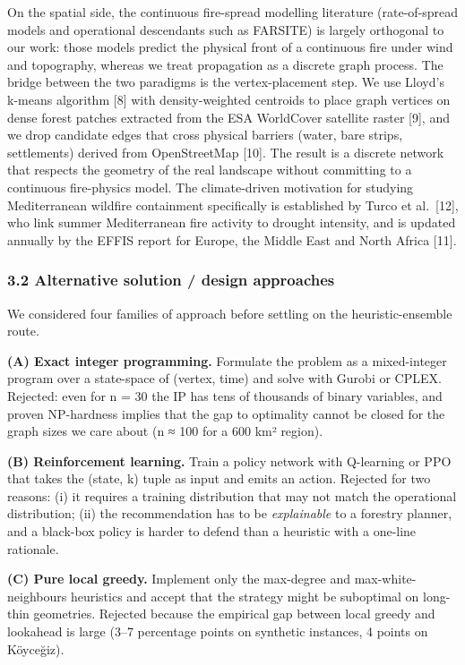 \documentclass[
  11pt,
]{article}
\begin{document}
On the spatial side, the continuous fire-spread modelling literature
(rate-of-spread models and operational descendants such as FARSITE) is
largely orthogonal to our work: those models predict the physical front
of a continuous fire under wind and topography, whereas we treat
propagation as a discrete graph process. The bridge between the two
paradigms is the vertex-placement step. We use Lloyd's k-means algorithm
{[}8{]} with density-weighted centroids to place graph vertices on dense
forest patches extracted from the ESA WorldCover satellite raster
{[}9{]}, and we drop candidate edges that cross physical barriers
(water, bare strips, settlements) derived from OpenStreetMap {[}10{]}.
The result is a discrete network that respects the geometry of the real
landscape without committing to a continuous fire-physics model. The
climate-driven motivation for studying Mediterranean wildfire
containment specifically is established by Turco et al.~{[}12{]}, who
link summer Mediterranean fire activity to drought intensity, and is
updated annually by the EFFIS report for Europe, the Middle East and
North Africa {[}11{]}.

\subsubsection{3.2 Alternative solution / design
approaches}\label{alternative-solution-design-approaches}

We considered four families of approach before settling on the
heuristic-ensemble route.

\textbf{(A) Exact integer programming.} Formulate the problem as a
mixed-integer program over a state-space of (vertex, time) and solve
with Gurobi or CPLEX. Rejected: even for n = 30 the IP has tens of
thousands of binary variables, and proven NP-hardness implies that the
gap to optimality cannot be closed for the graph sizes we care about (n
≈ 100 for a 600 km² region).

\textbf{(B) Reinforcement learning.} Train a policy network with
Q-learning or PPO that takes the (state, k) tuple as input and emits an
action. Rejected for two reasons: (i) it requires a training
distribution that may not match the operational distribution; (ii) the
recommendation has to be \emph{explainable} to a forestry planner, and a
black-box policy is harder to defend than a heuristic with a one-line
rationale.

\textbf{(C) Pure local greedy.} Implement only the max-degree and
max-white-neighbours heuristics and accept that the strategy might be
suboptimal on long-thin geometries. Rejected because the empirical gap
between local greedy and lookahead is large (3--7 percentage points on
synthetic instances, 4 points on Köyceğiz).
\end{document}
